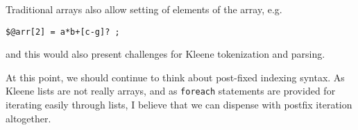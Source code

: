 Traditional arrays also allow setting of elements of the array, e.g.

\begin{Verbatim}
$@arr[2] = a*b+[c-g]? ;
\end{Verbatim}

\noindent
and this would also present challenges for Kleene tokenization and parsing.

At this point, we should continue to think about post-fixed indexing
syntax.  As Kleene lists are not really arrays, and as \texttt{foreach}
statements are provided for iterating easily through lists, I believe
that we can dispense with postfix iteration altogether.


